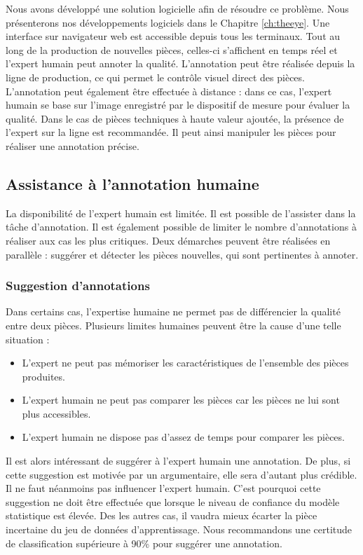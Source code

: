 Nous avons développé une solution logicielle afin de résoudre ce problème.
Nous présenterons nos développements logiciels dans le Chapitre \ref{ch:theeye}.
Une interface sur navigateur web est accessible depuis tous les terminaux.
Tout au long de la production de nouvelles pièces, celles-ci s'affichent en temps réel et l'expert humain peut annoter la qualité.
L'annotation peut être réalisée depuis la ligne de production, ce qui permet le contrôle visuel direct des pièces.
L'annotation peut également être effectuée à distance : dans ce cas, l'expert humain se base sur l'image enregistré par le dispositif de mesure pour évaluer la qualité.
Dans le cas de pièces techniques à haute valeur ajoutée, la présence de l'expert sur la ligne est recommandée.
Il peut ainsi manipuler les pièces pour réaliser une annotation précise.

\subsection{Assistance à l'annotation humaine} \label{subsec:labelling_assistance}
La disponibilité de l'expert humain est limitée.
Il est possible de l'assister dans la tâche d'annotation.
Il est également possible de limiter le nombre d'annotations à réaliser aux cas les plus critiques.
Deux démarches peuvent être réalisées en parallèle : suggérer et détecter les pièces nouvelles, qui sont pertinentes à annoter.

\subsubsection{Suggestion d'annotations}
Dans certains cas, l'expertise humaine ne permet pas de différencier la qualité entre deux pièces.
Plusieurs limites humaines peuvent être la cause d'une telle situation :
\begin{itemize}
    \item L'expert ne peut pas mémoriser les caractéristiques de l'ensemble des pièces produites.
    \item L'expert humain ne peut pas comparer les pièces car les pièces ne lui sont plus accessibles.
    \item L'expert humain ne dispose pas d'assez de temps pour comparer les pièces.
\end{itemize}

Il est alors intéressant de suggérer à l'expert humain une annotation.
De plus, si cette suggestion est motivée par un argumentaire, elle sera d'autant plus crédible.
Il ne faut néanmoins pas influencer l'expert humain.
C'est pourquoi cette suggestion ne doit être effectuée que lorsque le niveau de confiance du modèle statistique est élevée.
Des les autres cas, il vaudra mieux écarter la pièce incertaine du jeu de données d'apprentissage.
Nous recommandons une certitude de classification supérieure à 90\% pour suggérer une annotation.

